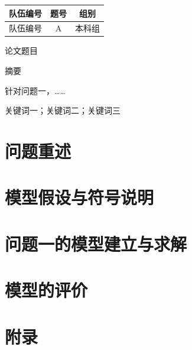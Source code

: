 \documentclass[UTF8,12pt,a4paper]{ctexart}
\newif\ifwithtoc \withtocfalse   %
\newcommand{\TeamNumber}{队伍编号}
\newcommand{\ProblemChosen}{A}
\newcommand{\Group}{本科组}
\newcommand{\PaperTitle}{论文题目}
\begin{document}
\begin{center}
\begin{tabular}{|c|c|c|}
\hline
队伍编号 & 题号 & 组别 \\ \hline
\TeamNumber & \ProblemChosen & \Group \\ \hline
\end{tabular}

\bigskip
{\heiti \PaperTitle}\par\medskip
{\heiti 摘\quad 要}
\end{center}
针对问题一，……

\medskip
{}关键词一；关键词二；关键词三
\clearpage

\ifwithtoc
\tableofcontents
\clearpage
\fi

\section{问题重述}
\section{模型假设与符号说明}
\section{问题一的模型建立与求解}
\section{模型的评价}

% 

\clearpage
\appendix
\section*{附录}
\end{document}
